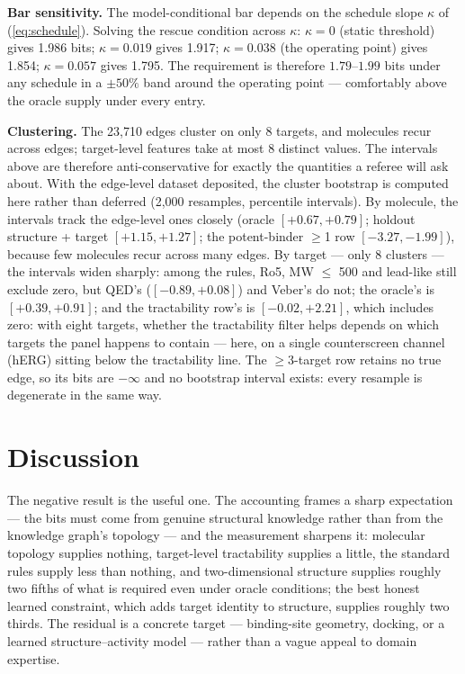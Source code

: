 \documentclass[11pt]{article}
\begin{document}
\textbf{Bar sensitivity.} The model-conditional bar depends on the schedule
slope $\kappa$ of (\ref{eq:schedule}). Solving the rescue condition across
$\kappa$: $\kappa = 0$ (static threshold) gives 1.986 bits;
$\kappa = 0.019$ gives 1.917; $\kappa = 0.038$ (the operating point)
gives 1.854; $\kappa = 0.057$ gives 1.795. The requirement is therefore
$1.79$--$1.99$ bits under any schedule in a $\pm 50\%$ band around the
operating point --- comfortably above the oracle supply under every entry.

\textbf{Clustering.} The 23{,}710 edges cluster on only 8 targets,
and molecules recur across edges; target-level features take at most 8
distinct values. The intervals above are therefore anti-conservative
for exactly the quantities a referee will ask about. With the
edge-level dataset deposited, the cluster bootstrap is computed here
rather than deferred (2,000 resamples, percentile intervals). By
molecule, the intervals track the edge-level ones closely (oracle
$[+0.67, +0.79]$; holdout structure + target
$[+1.15, +1.27]$; the potent-binder $\geq$1 row
$[-3.27, -1.99]$), because few molecules recur across many edges.
By target --- only 8 clusters --- the intervals widen sharply: among
the rules, Ro5, MW $\leq$ 500 and lead-like still exclude zero, but
QED's ($[-0.89, +0.08]$) and Veber's do not; the oracle's is
$[+0.39, +0.91]$; and the tractability row's is
$[-0.02, +2.21]$, which includes zero: with eight targets, whether the
tractability filter helps depends on which targets the panel happens
to contain --- here, on a single counterscreen channel (hERG) sitting
below the tractability line. The $\geq$3-target row retains no true
edge, so its bits are $-\infty$ and no bootstrap interval exists:
every resample is degenerate in the same way.

\section{Discussion}

The negative result is the useful one. The accounting frames a sharp
expectation --- the bits must come from genuine structural knowledge rather
than from the knowledge graph's topology --- and the measurement sharpens
it: molecular topology supplies nothing, target-level tractability
supplies a little, the standard rules supply less than nothing, and
two-dimensional structure supplies roughly two fifths of what is
required even under oracle conditions; the best honest learned
constraint, which adds target identity to structure, supplies roughly
two thirds. The residual is a concrete target
--- binding-site geometry, docking, or a learned structure--activity model
--- rather than a vague appeal to domain expertise.
\end{document}
